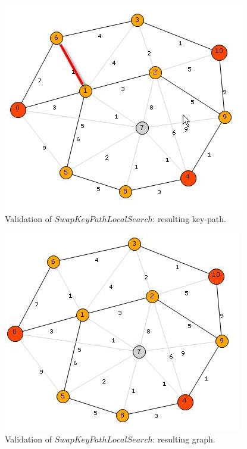\begin{figure}[H]
\begin{center}
\includegraphics[scale=0.9]{30.jpg}
\caption{Validation of $SwapKeyPathLocalSearch$: resulting key-path.}\label{fig:30}
\end{center} 
\end{figure}

\begin{figure}[H]
\begin{center}
\includegraphics[scale=0.9]{31.jpg}
\caption{Validation of $SwapKeyPathLocalSearch$: resulting graph.}\label{fig:31}
\end{center} 
\end{figure}

